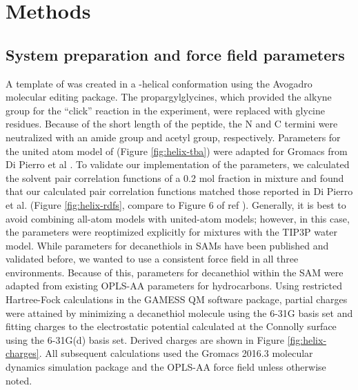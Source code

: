 \section{Methods}\label{helix-methods}

\subsection{System preparation and force field parameters}

A template of \pep{} was created in a \textalpha{}-helical conformation using the Avogadro molecular editing package\cite{Hanwell2012}.
The propargylglycines, which provided the alkyne group for the ``click'' reaction in the experiment, were replaced with glycine residues. 
Because of the short length of the peptide, the N and C termini were neutralized with an amide group and acetyl group, respectively. 
Parameters for the united atom model of \tba{} (Figure \ref{fig:helix-tba}) were adapted for Gromacs from Di Pierro et al \cite{DiPierro2015}.
To validate our implementation of the \tba{} parameters, we calculated the solvent pair correlation functions of a 0.2 mol fraction \tba{} in  mixture and found that our calculated pair correlation functions matched those reported in Di Pierro et al. (Figure \ref{fig:helix-rdfs}, compare to Figure 6 of ref ). 
Generally, it is best to avoid combining all-atom models with united-atom models; 
however, in this case, the \tba{} parameters were reoptimized explicitly for mixtures with the TIP3P water model. 
While parameters for decanethiols in SAMs have been published and validated before\cite{Godawat2009}, we wanted to use a consistent force field in all three environments. 
Because of this, parameters for decanethiol within the SAM were adapted from existing OPLS-AA parameters for hydrocarbons\cite{Kaminski1994}. 
Using restricted Hartree-Fock calculations in the GAMESS QM software package\cite{Schmidt1993, Gordon2005}, partial charges were attained by minimizing a decanethiol molecule using the 6-31G basis set and fitting charges to the electrostatic potential calculated at the Connolly surface using the 6-31G(d) basis set. 
Derived charges are shown in Figure \ref{fig:helix-charges}. 
All subsequent calculations used the Gromacs 2016.3 molecular dynamics simulation package\cite{Berendsen1995, Lindahl2001, VanDerSpoel2005, Hess2008, Pronk2013, Pall2015, Abraham2015} and the OPLS-AA force field\cite{Jorgensen1996, Kaminski2001} unless otherwise noted.

